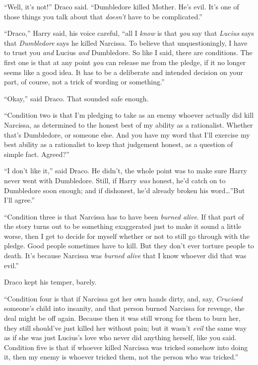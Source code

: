 “Well, it’s not!” Draco said. “Dumbledore killed Mother. He’s evil. It’s one of those things you talk about that \emph{doesn’t} have to be complicated.”

“Draco,” Harry said, his voice careful, “all I \emph{know} is that \emph{you} say that \emph{Lucius} says that \emph{Dumbledore} says he killed Narcissa. To believe that unquestioningly, I have to trust you \emph{and} Lucius \emph{and} Dumbledore. So like I said, there are conditions. The first one is that at any point \emph{you} can release me from the pledge, if it no longer seems like a good idea. It has to be a deliberate and intended decision on your part, of course, not a trick of wording or something.”

“Okay,” said Draco. That sounded safe enough.

“Condition two is that I’m pledging to take as an enemy whoever actually did kill Narcissa, as determined to the honest best of my ability as a rationalist. Whether that’s Dumbledore, or someone else. And you have my word that I’ll exercise my best ability as a rationalist to keep that judgement honest, as a question of simple fact. Agreed?”

“I don’t like it,” said Draco. He didn’t, the whole point was to make sure Harry never went with Dumbledore. Still, if Harry \emph{was} honest, he’d catch on to Dumbledore soon enough; and if dishonest, he’d already broken his word…”But I’ll agree.”

“Condition three is that Narcissa has to have been \emph{burned alive}. If that part of the story turns out to be something exaggerated just to make it sound a little worse, then I get to decide for myself whether or not to still go through with the pledge. Good people sometimes have to kill. But they don’t ever torture people to death. It’s because Narcissa was \emph{burned alive} that I know whoever did that was evil.”

Draco kept his temper, barely.

“Condition four is that if Narcissa got her own hands dirty, and, say, \emph{Crucioed} someone’s child into insanity, and that person burned Narcissa for revenge, the deal might be off again. Because then it was still wrong for them to burn her, they still should’ve just killed her without pain; but it wasn’t \emph{evil} the same way as if she was just Lucius’s love who never did anything herself, like you said. Condition five is that if whoever killed Narcissa was tricked somehow into doing it, then my enemy is whoever tricked them, not the person who was tricked.”

